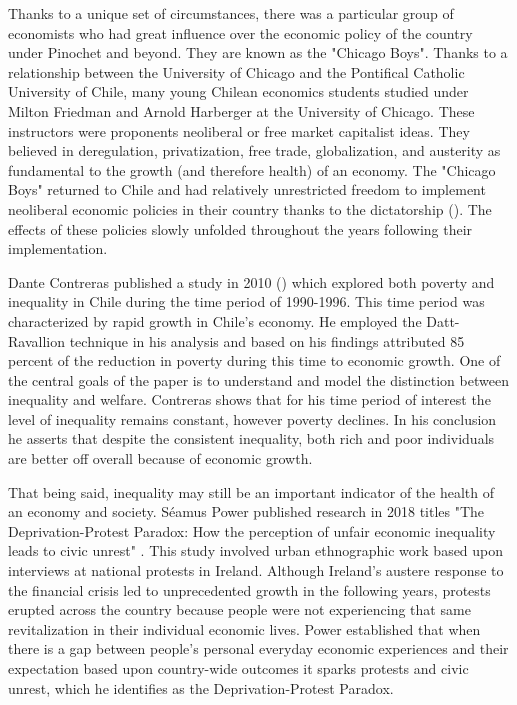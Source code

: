 \documentclass[12pt,english]{article}
\begin{document}
Thanks to a unique set of circumstances, there was a particular group of economists who had great influence over the economic policy of the country under Pinochet and beyond. They are known as the "Chicago Boys". Thanks to a relationship between the University of Chicago and the Pontifical Catholic University of Chile, many young Chilean economics students studied under Milton Friedman and Arnold Harberger at the University of Chicago. These instructors were proponents neoliberal or free market capitalist ideas. They believed in deregulation, privatization, free trade, globalization, and austerity as fundamental to the growth (and therefore health) of an economy. The "Chicago Boys" returned to Chile and had relatively unrestricted freedom to implement neoliberal economic policies in their country thanks to the dictatorship (\citet{chicago}). The effects of these policies slowly unfolded throughout the years following their implementation.

Dante Contreras published a study in 2010  (\citet{doi:10.1080/00220380412331322871}) which explored both poverty and inequality in Chile during the time period of 1990-1996. This time period was characterized by rapid growth in Chile's economy. He employed the Datt-Ravallion technique in his analysis and based on his findings attributed 85 percent of the reduction in poverty during this time to economic growth. One of the central goals of the paper is to understand and model the distinction between inequality and welfare. Contreras shows that for his time period of interest the level of inequality remains constant, however poverty declines. In his conclusion he asserts that despite the consistent inequality, both rich and poor individuals are better off overall because of economic growth. 

That being said, inequality may still be an important indicator of the health of an economy and society. Séamus Power published research in 2018 titles "The Deprivation-Protest Paradox: How the perception of unfair economic inequality leads to civic unrest" \citet{power_2018}. This study involved urban ethnographic work based upon interviews at national protests in Ireland. Although Ireland's austere response to the financial crisis led to unprecedented growth in the following years, protests erupted across the country because people were not experiencing that same revitalization in their individual economic lives. Power established that when there is a gap between people's personal everyday economic experiences and their expectation based upon country-wide outcomes it sparks protests and civic unrest, which he identifies as the Deprivation-Protest Paradox. 
\end{document}
